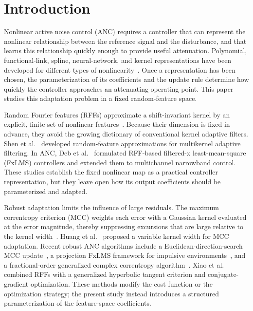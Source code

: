 \documentclass[preprint,12pt]{elsarticle}
\begin{document}
\section{Introduction}

Nonlinear active noise control (ANC) requires a controller that can represent the nonlinear relationship between the reference signal and the disturbance, and that learns this relationship quickly enough to provide useful attenuation. Polynomial, functional-link, spline, neural-network, and kernel representations have been developed for different types of nonlinearity~\cite{lu2021survey}. Once a representation has been chosen, the parameterization of its coefficients and the update rule determine how quickly the controller approaches an attenuating operating point. This paper studies this adaptation problem in a fixed random-feature space.

Random Fourier features (RFFs) approximate a shift-invariant kernel by an explicit, finite set of nonlinear features~\cite{rahimi2007}. Because their dimension is fixed in advance, they avoid the growing dictionary of conventional kernel adaptive filters. Shen et al.~\cite{shen2020} developed random-feature approximations for multikernel adaptive filtering. In ANC, Deb et al.~\cite{deb2021} formulated RFF-based filtered-x least-mean-square (FxLMS) controllers and extended them to multichannel narrowband control. These studies establish the fixed nonlinear map as a practical controller representation, but they leave open how its output coefficients should be parameterized and adapted.

Robust adaptation limits the influence of large residuals. The maximum correntropy criterion (MCC) weights each error with a Gaussian kernel evaluated at the error magnitude, thereby suppressing excursions that are large relative to the kernel width~\cite{liu2007}. Huang et al.~\cite{huang2021} proposed a variable kernel width for MCC adaptation. Recent robust ANC algorithms include a Euclidean-direction-search MCC update~\cite{wang2025eds}, a projection FxLMS framework for impulsive environments~\cite{feng2024}, and a fractional-order generalized complex correntropy algorithm~\cite{wang2025frac}. Xiao et al.~\cite{xiao2023} combined RFFs with a generalized hyperbolic tangent criterion and conjugate-gradient optimization. These methods modify the cost function or the optimization strategy; the present study instead introduces a structured parameterization of the feature-space coefficients.
\end{document}
